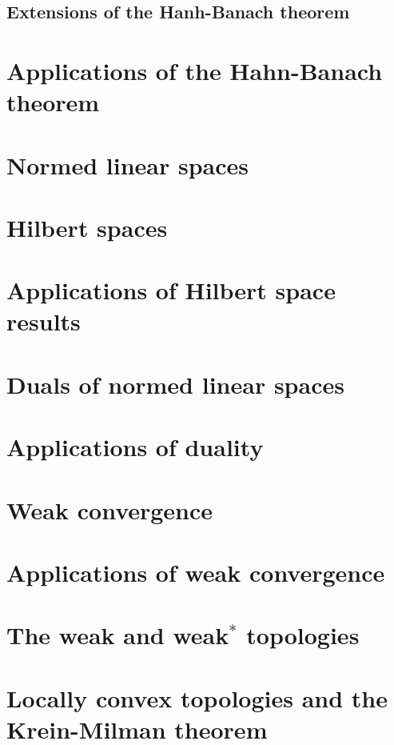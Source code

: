 \documentclass[11pt]{elegantbook}
\begin{document}
\section{Extensions of the Hanh-Banach theorem}

\chapter{Applications of the Hahn-Banach theorem}

\chapter{Normed linear spaces}

\chapter{Hilbert spaces}

\chapter{Applications of Hilbert space results}

\chapter{Duals of normed linear spaces}

\chapter{Applications of duality}

\chapter{Weak convergence}

\chapter{Applications of weak convergence}

\chapter{The weak and weak$^\ast$ topologies}

\chapter{Locally convex topologies and the Krein-Milman theorem}
\end{document}
